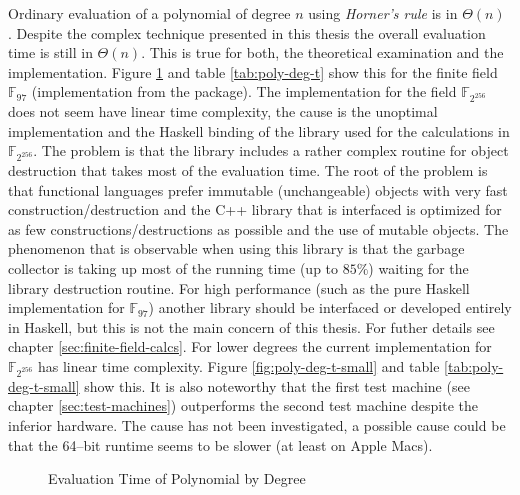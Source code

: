 %
%
\label{sec:comp-complexity}

Ordinary evaluation of a polynomial of degree $n$ using \emph{Horner's rule} is
in $\Theta(n)$ \cite{cormen01}. Despite the complex technique presented in this
thesis the overall evaluation time is still in $\Theta(n)$. This is true for
both, the theoretical examination and the implementation. Figure
\ref{fig:poly-deg-t} and table \ref{tab:poly-deg-t} show this for the finite
field $\mathbb{F}_{97}$ (implementation from the \JWTLhaskellForMaths{}
package). The implementation for the field $\mathbb{F}_{2^{256}}$ does not seem
have linear time complexity, the cause is the unoptimal implementation and the
Haskell binding of the library used for the calculations in
$\mathbb{F}_{2^{256}}$. The problem is that the library includes a rather
complex routine for object destruction that takes most of the evaluation time.
The root of the problem is that functional languages prefer immutable
(unchangeable) objects with very fast construction/destruction and the C++
library that is interfaced is optimized for as few constructions/destructions
as possible and the use of mutable objects. The phenomenon that is observable
when using this library is that the garbage collector is taking up most of the
running time (up to $85\%$) waiting for the library destruction routine. For
high performance (such as the pure Haskell implementation for $\mathbb{F}_{97}$)
another library should be interfaced or developed entirely in Haskell, but this
is not the main concern of this thesis. For futher details see chapter
\ref{sec:finite-field-calcs}. For lower degrees the current implementation for
$\mathbb{F}_{2^{256}}$ has linear time complexity. Figure
\ref{fig:poly-deg-t-small} and table \ref{tab:poly-deg-t-small} show
this. It is also noteworthy that the first test machine (see chapter
\ref{sec:test-machines}) outperforms the second test machine despite the
inferior hardware. The cause has not been investigated, a possible cause could
be that the 64--bit \JWTghc{} runtime seems to be slower (at least on Apple
Macs)\cite{lentczner11}.


\begin{figure}[ht]
  \centering
  
  \caption{Evaluation Time of Polynomial by Degree}
  \label{fig:poly-deg-t}
\end{figure}

